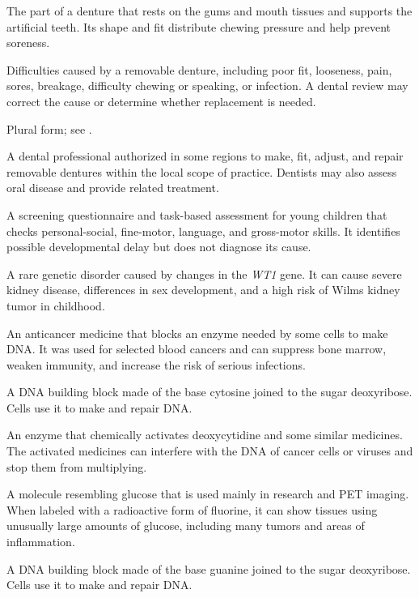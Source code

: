 The part of a denture that rests on the gums and mouth tissues and supports the artificial teeth. Its shape and fit distribute chewing pressure and help prevent soreness.

 Difficulties caused by a removable denture, including poor fit, looseness, pain, sores, breakage, difficulty chewing or speaking, or infection. A dental review may correct the cause or determine whether replacement is needed.

 Plural form; see .

 A dental professional authorized in some regions to make, fit, adjust, and repair removable dentures within the local scope of practice. Dentists may also assess oral disease and provide related treatment.

 A screening questionnaire and task-based assessment for young children that checks personal-social, fine-motor, language, and gross-motor skills. It identifies possible developmental delay but does not diagnose its cause.

 A rare genetic disorder caused by changes in the \textit{WT1} gene. It can cause severe kidney disease, differences in sex development, and a high risk of Wilms kidney tumor in childhood.

 An anticancer medicine that blocks an enzyme needed by some cells to make DNA. It was used for selected blood cancers and can suppress bone marrow, weaken immunity, and increase the risk of serious infections.

 A DNA building block made of the base cytosine joined to the sugar deoxyribose. Cells use it to make and repair DNA.

 An enzyme that chemically activates deoxycytidine and some similar medicines. The activated medicines can interfere with the DNA of cancer cells or viruses and stop them from multiplying.

 A molecule resembling glucose that is used mainly in research and PET imaging. When labeled with a radioactive form of fluorine, it can show tissues using unusually large amounts of glucose, including many tumors and areas of inflammation.

 A DNA building block made of the base guanine joined to the sugar deoxyribose. Cells use it to make and repair DNA.

